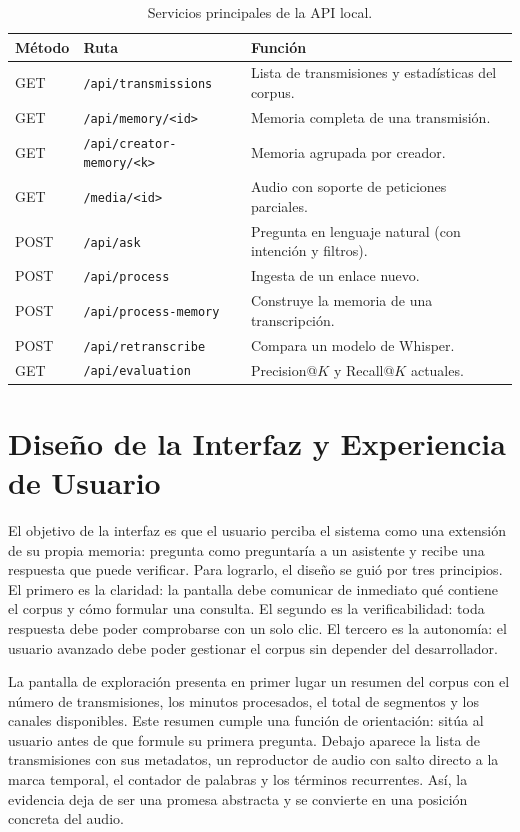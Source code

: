 \documentclass[12pt,a4paper]{article}
\begin{document}
\begin{table}[h]
\centering
\small
\begin{tabular}{@{}llp{7.4cm}@{}}
\toprule
\textbf{Método} & \textbf{Ruta} & \textbf{Función} \\
\midrule
GET  & \texttt{/api/transmissions}     & Lista de transmisiones y estadísticas del corpus. \\
GET  & \texttt{/api/memory/<id>}       & Memoria completa de una transmisión. \\
GET  & \texttt{/api/creator-memory/<k>}& Memoria agrupada por creador. \\
GET  & \texttt{/media/<id>}            & Audio con soporte de peticiones parciales. \\
POST & \texttt{/api/ask}               & Pregunta en lenguaje natural (con intención y filtros). \\
POST & \texttt{/api/process}           & Ingesta de un enlace nuevo. \\
POST & \texttt{/api/process-memory}    & Construye la memoria de una transcripción. \\
POST & \texttt{/api/retranscribe}      & Compara un modelo de Whisper. \\
GET  & \texttt{/api/evaluation}        & Precision@$K$ y Recall@$K$ actuales. \\
\bottomrule
\end{tabular}
\caption{Servicios principales de la API local.}
\label{tab:api}
\end{table}


\section{Diseño de la Interfaz y Experiencia de Usuario}
\label{sec:ux}

El objetivo de la interfaz es que el usuario perciba el sistema como una extensión de su propia memoria: pregunta como preguntaría a un asistente y recibe una respuesta que puede verificar. Para lograrlo, el diseño se guió por tres principios. El primero es la claridad: la pantalla debe comunicar de inmediato qué contiene el corpus y cómo formular una consulta. El segundo es la verificabilidad: toda respuesta debe poder comprobarse con un solo clic. El tercero es la autonomía: el usuario avanzado debe poder gestionar el corpus sin depender del desarrollador.

La pantalla de exploración presenta en primer lugar un resumen del corpus con el número de transmisiones, los minutos procesados, el total de segmentos y los canales disponibles. Este resumen cumple una función de orientación: sitúa al usuario antes de que formule su primera pregunta. Debajo aparece la lista de transmisiones con sus metadatos, un reproductor de audio con salto directo a la marca temporal, el contador de palabras y los términos recurrentes. Así, la evidencia deja de ser una promesa abstracta y se convierte en una posición concreta del audio.
\end{document}
